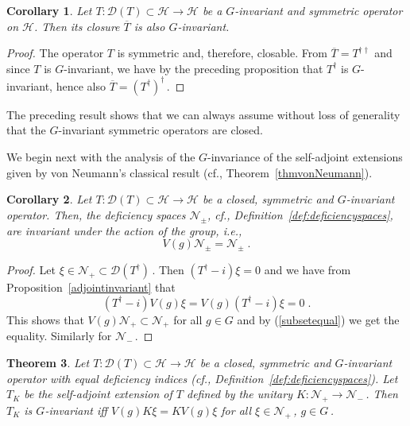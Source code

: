 \documentclass[a4paper,12pt]{amsart}
\renewcommand{\H}{\mathcal{H}}
\newcommand{\D}{\mathcal{D}}
\newcommand{\1}{\mathbb{I}}
\newtheorem{theorem}{Theorem}
\newtheorem{corollary}[theorem]{Corollary}
\numberwithin{equation}{section}
\numberwithin{theorem}{section}
\begin{document}
\begin{corollary}\label{cor:Gclosure}
 Let $T\colon\D(T)\subset\H\to\H$ be a $G$-invariant and symmetric operator on $\mathcal H$. Then its closure
 $\overline T$ is also $G$-invariant.
\end{corollary}
\begin{proof}
 The operator $T$ is symmetric and, therefore, closable. From $\overline{T}=T^{\dagger\dagger}$ and since
 $T$ is $G$-invariant, we have by the preceding proposition that $T^\dagger$ is $G$-invariant,
 hence also $\overline{T}=(T^\dagger)^\dagger$\,.
\end{proof}

The preceding result shows that we can always assume without loss of generality that the $G$-invariant
symmetric operators are closed.

We begin next with the analysis of the $G$-invariance of the self-adjoint extensions given by von Neumann's
classical result (cf., Theorem~\ref{thmvonNeumann}).

\begin{corollary}\label{cor:invariantdeficiency}
Let $T\colon\D(T)\subset\H\to\H$ be a closed, symmetric and $G$-invariant operator.
Then, the deficiency spaces $\mathcal{N}_{\pm}$, cf.,
Definition~\ref{def:deficiencyspaces}, are invariant under the action of the group, i.e.,
$$V(g)\mathcal{N}_{\pm}=\mathcal{N}_{\pm}\;.$$
\end{corollary}

\begin{proof}
Let $\xi\in\mathcal{N}_+\subset \D(T^\dagger)$\,. Then $(T^\dagger-i)\xi=0$ and we have 
from Proposition~\ref{adjointinvariant} that
\begin{equation*}
(T^\dagger-i)V(g)\xi=V(g)(T^\dagger-i)\xi=0\;.
\end{equation*}
This shows that $V(g)\mathcal{N}_{+}\subset \mathcal{N}_{+}$ for all $g \in G$
and by (\ref{subsetequal}) we get the equality. Similarly for $\mathcal{N}_-$\,.
\end{proof}

\begin{theorem}\label{Ginvariantoperator}
Let $T\colon\D(T)\subset\H\to\H$ be a closed, symmetric and $G$-invariant operator with equal deficiency indices
(cf., Definition~\ref{def:deficiencyspaces}).
Let $T_K$ be the self-adjoint extension of $T$ defined by the unitary $K\colon\mathcal{N}_+\to\mathcal{N}_-$\,.
Then $T_K$ is $G$-invariant iff $V(g)K \xi=K V(g) \xi$ for all $\xi\in\mathcal{N_+}$\,, $g\in G$\,.
\end{theorem}
\end{document}

